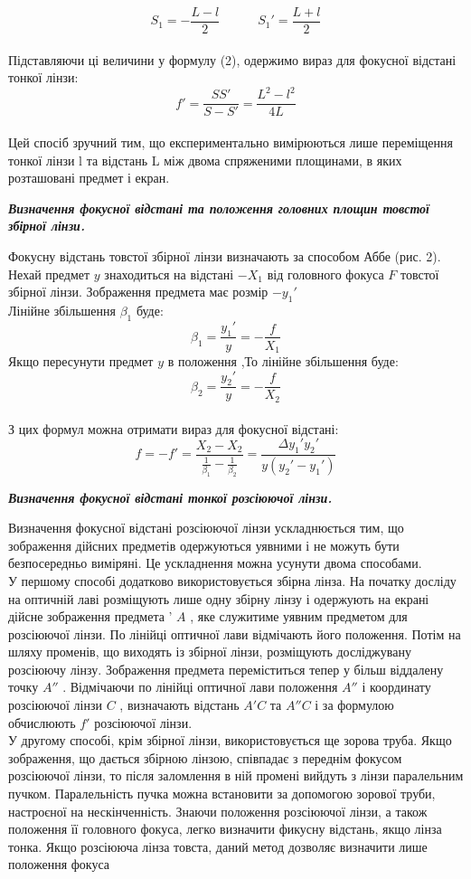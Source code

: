 $$S_1 = -\frac{L-l}{2} \quad \quad \quad S_1' = \frac{L+l}{2}$$ \\
Підставляючи ці величини у формулу (2), одержимо вираз для фокусної відстані
тонкої лінзи:
$$f' = \frac{SS'}{S-S'} = \frac{L^2 - l^2}{4L}$$ \\
Цей спосіб зручний тим, що експериментально вимірюються лише переміщення
тонкої лінзи l та відстань L між двома спряженими площинами, в яких розташовані предмет і
екран.
\newpage
\begin{center}
  {\textbf{\emph{Визначення фокусної відстані та положення головних площин товстої
збірної лінзи.}}}
\end{center}
Фокусну відстань товстої збірної лінзи визначають за способом Аббе (рис. 2). Нехай
предмет $y$ знаходиться на відстані $-X_1$
 від головного фокуса $F$ товстої збірної лінзи.
Зображення предмета має розмір $-y_1'$\\
Лінійне збільшення ${\beta}_1$ буде:
$${\beta}_1 = \frac{y_1'}{y}=-\frac{f}{X_1}$$
Якщо пересунути предмет $y$ в положення ,То лінійне збільшення буде:
$${\beta}_2 = \frac{y_2'}{y}=-\frac{f}{X_2}$$ \\
З цих формул можна отримати вираз для фокусної відстані:
$$f=-f'=\frac{X_2-X_2}{\frac{1}{{\beta}_1}-\frac{1}{{\beta}_2}}=\frac{\Delta y_1' y_2'}{y(y_2'-y_1')}$$
\begin{center}
  {\textbf{\emph{Визначення фокусної відстані тонкої розсіюючої лінзи.}}}
\end{center}
Визначення фокусної відстані розсіюючої лінзи ускладнюється тим, що зображення
дійсних предметів одержуються уявними і не можуть бути безпосередньо виміряні. Це
ускладнення можна усунути двома способами.\\
У першому способі додатково використовується збірна лінза. На початку досліду на
оптичній лаві розміщують лише одну збірну лінзу  і одержують на екрані дійсне
зображення предмета '
$A$ , яке служитиме уявним предметом для розсіюючої лінзи. По лінійці
оптичної лави відмічають його положення. Потім на шляху променів, що виходять із збірної
лінзи, розміщують досліджувану розсіюючу лінзу. Зображення предмета переміститься
тепер у більш віддалену точку
$A''$ . Відмічаючи по лінійці оптичної лави положення $A''$ і координату розсіюючої лінзи $C$ , визначають відстань $A'C$ та $A''C$ і за формулою обчислюють $f'$ розсіюючої лінзи.\\
У другому способі, крім збірної лінзи, використовується ще зорова труба. Якщо
зображення, що дається збірною лінзою, співпадає з переднім фокусом розсіюючої лінзи, то
після заломлення в ній промені вийдуть з лінзи паралельним пучком. Паралельність пучка можна
встановити за допомогою зорової труби, настроєної на нескінченність. Знаючи положення
розсіюючої лінзи, а також положення її головного фокуса, легко визначити фикусну відстань,
якщо лінза тонка. Якщо розсіююча лінза товста, даний метод дозволяє визначити лише
положення фокуса
